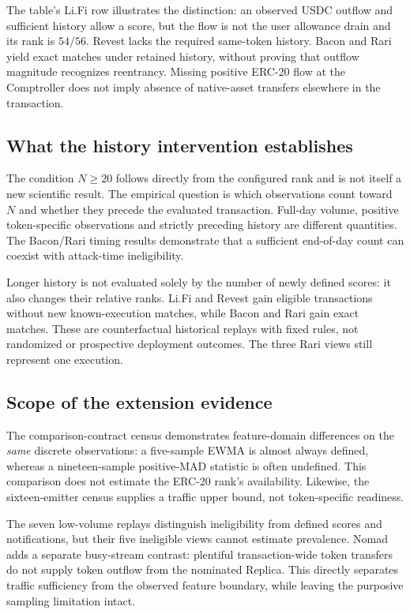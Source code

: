 \documentclass[preprint,12pt,authoryear]{elsarticle}
\begin{document}
The table's Li.Fi row illustrates the distinction: an observed USDC outflow and sufficient history allow a score, but the flow is not the user allowance drain and its rank is $54/56$. Revest lacks the required same-token history. Bacon and Rari yield exact matches under retained history, without proving that outflow magnitude recognizes reentrancy. Missing positive ERC-20 flow at the Comptroller does not imply absence of native-asset transfers elsewhere in the transaction.

\subsection{What the history intervention establishes}
The condition $N\geq20$ follows directly from the configured rank and is not itself a new scientific result. The empirical question is which observations count toward $N$ and whether they precede the evaluated transaction. Full-day volume, positive token-specific observations and strictly preceding history are different quantities. The Bacon/Rari timing results demonstrate that a sufficient end-of-day count can coexist with attack-time ineligibility.

Longer history is not evaluated solely by the number of newly defined scores: it also changes their relative ranks. Li.Fi and Revest gain eligible transactions without new known-execution matches, while Bacon and Rari gain exact matches. These are counterfactual historical replays with fixed rules, not randomized or prospective deployment outcomes. The three Rari views still represent one execution.

\subsection{Scope of the extension evidence}\label{sec:transport}
The comparison-contract census demonstrates feature-domain differences on the \emph{same} discrete observations: a five-sample EWMA is almost always defined, whereas a nineteen-sample positive-MAD statistic is often undefined. This comparison does not estimate the ERC-20 rank's availability. Likewise, the sixteen-emitter census supplies a traffic upper bound, not token-specific readiness.

The seven low-volume replays distinguish ineligibility from defined scores and notifications, but their five ineligible views cannot estimate prevalence. Nomad adds a separate busy-stream contrast: plentiful transaction-wide token transfers do not supply token outflow from the nominated Replica. This directly separates traffic sufficiency from the observed feature boundary, while leaving the purposive sampling limitation intact.
\end{document}
